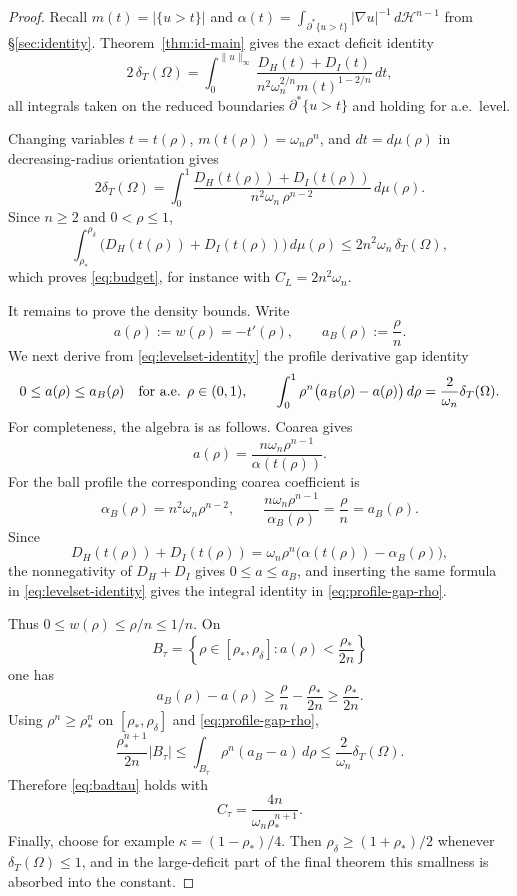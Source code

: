 \documentclass[11pt]{amsart}
\theoremstyle{definition}
\newcommand{\Om}{\Omega}
\newcommand{\dT}{\delta_T}
\newcommand{\rstar}{\rho_*}
\newcommand{\rdel}{\rho_\delta}
\newcommand{\wt}{w}
\newcommand{\Hn}{\mathcal H^{n-1}}
\begin{document}
\begin{proof}
Recall \(m(t)=|\{u>t\}|\) and
\(\alpha(t)=\int_{\partial^*\{u>t\}}|\nabla u|^{-1}\,d\Hn\) from
\S\ref{sec:identity}.  Theorem~\ref{thm:id-main} gives the exact deficit
identity
\begin{equation}\label{eq:levelset-identity}
   2\,\dT(\Om)
   =
   \int_0^{\|u\|_\infty}
      \frac{D_H(t)+D_I(t)}
      {n^2\omega_n^{2/n}m(t)^{1-2/n}}\,dt ,
\end{equation}
all integrals taken on the reduced boundaries \(\partial^*\{u>t\}\) and holding
for a.e.\ level.

Changing variables \(t=t(\rho)\), \(m(t(\rho))=\omega_n\rho^n\), and
\(dt=d\mu(\rho)\) in decreasing-radius orientation gives
\[
   2\dT(\Om)
   =
   \int_0^1
      \frac{D_H(t(\rho))+D_I(t(\rho))}
      {n^2\omega_n\,\rho^{n-2}}\,d\mu(\rho).
\]
Since \(n\ge2\) and \(0<\rho\le1\),
\[
   \int_{\rstar}^{\rdel}
      \bigl(D_H(t(\rho))+D_I(t(\rho))\bigr)\,d\mu(\rho)
   \le 2n^2\omega_n\,\dT(\Om),
\]
which proves \eqref{eq:budget}, for instance with
\(C_L=2n^2\omega_n\).

It remains to prove the density bounds.  Write
\[
   a(\rho):=\wt(\rho)=-t'(\rho),\qquad a_B(\rho):=\frac{\rho}{n}.
\]
We next derive from \eqref{eq:levelset-identity} the profile
derivative gap identity
\begin{equation}\label{eq:profile-gap-rho}
   0\le a(\rho)\le a_B(\rho)
   \quad\hbox{for a.e. }\rho\in(0,1),
   \qquad
   \int_0^1 \rho^n\bigl(a_B(\rho)-a(\rho)\bigr)\,d\rho
   =
   \frac{2}{\omega_n}\dT(\Om).
\end{equation}
For completeness, the algebra is as follows.  Coarea gives
\[
   a(\rho)=\frac{n\omega_n\rho^{n-1}}{\alpha(t(\rho))}.
\]
For the ball profile the corresponding coarea coefficient is
\[
   \alpha_B(\rho)=n^2\omega_n\rho^{n-2},
   \qquad
   \frac{n\omega_n\rho^{n-1}}{\alpha_B(\rho)}=\frac{\rho}{n}=a_B(\rho).
\]
Since
\[
   D_H(t(\rho))+D_I(t(\rho))
   =\omega_n\rho^n\bigl(\alpha(t(\rho))-\alpha_B(\rho)\bigr),
\]
the nonnegativity of \(D_H+D_I\) gives \(0\le a\le a_B\), and inserting
the same formula in \eqref{eq:levelset-identity} gives the
integral identity in \eqref{eq:profile-gap-rho}.

Thus \(0\le\wt(\rho)\le\rho/n\le1/n\).  On
\[
   B_\tau=\left\{\rho\in[\rstar,\rdel]:
      a(\rho)<\frac{\rstar}{2n}\right\}
\]
one has
\[
   a_B(\rho)-a(\rho)\ge \frac{\rho}{n}-\frac{\rstar}{2n}
      \ge\frac{\rstar}{2n}.
\]
Using \(\rho^n\ge\rstar^n\) on \([\rstar,\rdel]\) and
\eqref{eq:profile-gap-rho},
\[
   \frac{\rstar^{n+1}}{2n}|B_\tau|
   \le
   \int_{B_\tau}\rho^n(a_B-a)\,d\rho
   \le \frac{2}{\omega_n}\dT(\Om).
\]
Therefore \eqref{eq:badtau} holds with
\[
   C_\tau=\frac{4n}{\omega_n\rstar^{n+1}}.
\]
Finally, choose for example
\(\kappa=(1-\rstar)/4\).  Then \(\rdel\ge(1+\rstar)/2\) whenever
\(\dT(\Om)\le1\), and in the large-deficit part of the final theorem this
smallness is absorbed into the constant.
\end{proof}
\end{document}
